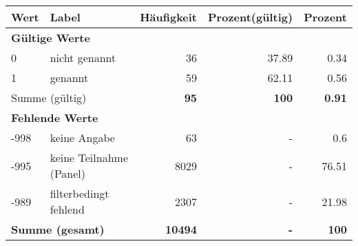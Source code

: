      \begin{longtable}{lXrrr}
     \toprule
     \textbf{Wert} & \textbf{Label} & \textbf{Häufigkeit} & \textbf{Prozent(gültig)} & \textbf{Prozent} \\
     \endhead
     \midrule
     \multicolumn{5}{l}{\textbf{Gültige Werte}}\\

     0 &
     \multicolumn{1}{X}{ nicht genannt   } &


       \num{36} &
       \num[round-mode=places,round-precision=2]{37.89} &
         \num[round-mode=places,round-precision=2]{0.34} \\

     1 &
     \multicolumn{1}{X}{ genannt   } &


       \num{59} &
       \num[round-mode=places,round-precision=2]{62.11} &
         \num[round-mode=places,round-precision=2]{0.56} \\
     \midrule
     \multicolumn{2}{l}{Summe (gültig)} &
       \textbf{\num{95}} &
     \textbf{\num{100}} &
       \textbf{\num[round-mode=places,round-precision=2]{0.91}} \\
     \multicolumn{5}{l}{\textbf{Fehlende Werte}}\\
       -998 &
       keine Angabe &
         \num{63} &
        - &
         \num[round-mode=places,round-precision=2]{0.6} \\
       -995 &
       keine Teilnahme (Panel) &
         \num{8029} &
        - &
         \num[round-mode=places,round-precision=2]{76.51} \\
       -989 &
       filterbedingt fehlend &
         \num{2307} &
        - &
         \num[round-mode=places,round-precision=2]{21.98} \\
     \midrule
     \multicolumn{2}{l}{\textbf{Summe (gesamt)}} &
          \textbf{\num{10494}} &
        \textbf{-} &
        \textbf{\num{100}} \\
     \bottomrule
     \end{longtable}
     
